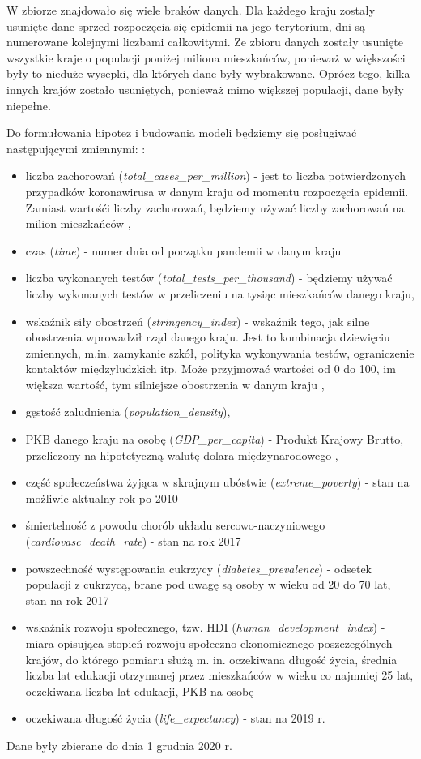 \documentclass[12pt]{mwbk}
\theoremstyle{plain}
\theoremstyle{definition}
\theoremstyle{remark}
\begin{document}
W zbiorze znajdowało się wiele braków danych. Dla każdego kraju zostały usunięte dane sprzed rozpoczęcia się epidemii na jego terytorium, dni są numerowane kolejnymi liczbami całkowitymi.
Ze zbioru danych zostały usunięte wszystkie kraje o populacji poniżej miliona mieszkańców, ponieważ w większości były to nieduże wysepki, dla których dane były wybrakowane. Oprócz tego, kilka innych krajów zostało usuniętych, ponieważ mimo większej populacji, dane były niepełne.

Do formułowania hipotez i budowania modeli będziemy się posługiwać następującymi zmiennymi: \cite{codebook}:
\begin{itemize}
	\item liczba zachorowań (\textit{total\_cases\_per\_million}) - jest to liczba potwierdzonych przypadków koronawirusa w danym kraju od momentu rozpoczęcia epidemii. Zamiast wartośći liczby zachorowań, będziemy używać liczby zachorowań na milion mieszkańców ,
	\item czas (\textit{time}) - numer dnia od początku pandemii w danym kraju
	\item liczba wykonanych testów (\textit{total\_tests\_per\_thousand}) - będziemy używać liczby wykonanych testów w przeliczeniu na tysiąc mieszkańców danego kraju,
	\item wskaźnik siły obostrzeń (\textit{stringency\_index}) - wskaźnik tego, jak silne obostrzenia wprowadził rząd danego kraju. Jest to kombinacja dziewięciu zmiennych, m.in. zamykanie szkół, polityka wykonywania testów, ograniczenie kontaktów międzyludzkich itp. Może przyjmować wartości od 0 do 100, im większa wartość, tym silniejsze obostrzenia w danym kraju \cite{stringency},
	\item gęstość zaludnienia (\textit{population\_density}),
	\item PKB danego kraju na osobę (\textit{GDP\_per\_capita}) - Produkt Krajowy Brutto, przeliczony na hipotetyczną walutę dolara międzynarodowego \cite{dollars},
	\item część społeczeństwa żyjąca w skrajnym ubóstwie (\textit{extreme\_poverty}) - stan na możliwie aktualny rok po 2010
	\item śmiertelność z powodu chorób układu sercowo-naczyniowego (\textit{cardiovasc\_death\_rate}) - stan na rok 2017
	\item powszechność występowania cukrzycy (\textit{diabetes\_prevalence}) - odsetek populacji z cukrzycą, brane pod uwagę są osoby w wieku od 20 do 70 lat, stan na rok 2017
	\item wskaźnik rozwoju społecznego, tzw. HDI (\textit{human\_development\_index}) -  miara opisująca stopień rozwoju społeczno-ekonomicznego poszczególnych krajów, do którego pomiaru służą m. in. oczekiwana długość życia, średnia liczba lat edukacji otrzymanej przez mieszkańców w wieku co najmniej 25 lat, oczekiwana liczba lat edukacji, PKB na osobę \cite{hdi}
	\item oczekiwana długość życia (\textit{life\_expectancy}) - stan na 2019 r.
	
\end{itemize}
Dane były zbierane do dnia 1 grudnia 2020 r. 
\end{document}
